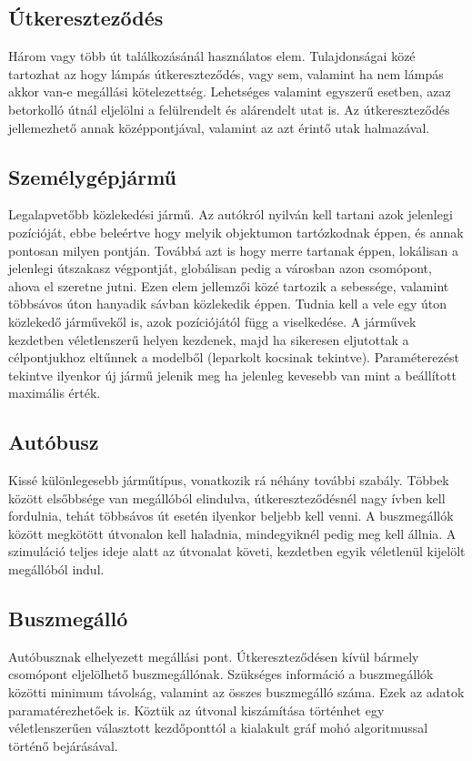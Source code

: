 \subsection{Útkereszteződés}
Három vagy több út találkozásánál használatos elem. Tulajdonságai közé tartozhat az hogy lámpás útkereszteződés, vagy sem, valamint ha nem lámpás akkor van-e megállási kötelezettség.
Lehetséges valamint egyszerű esetben, azaz betorkolló útnál eljelölni a felülrendelt és alárendelt utat is. Az útkereszteződés jellemezhető annak középpontjával, valamint az azt érintő utak
halmazával.
\subsection{Személygépjármű}
Legalapvetőbb közlekedési jármű. Az autókról nyilván kell tartani azok jelenlegi pozícióját, ebbe beleértve hogy melyik objektumon tartózkodnak éppen, és annak pontosan milyen pontján. Továbbá azt
is hogy merre tartanak éppen, lokálisan a jelenlegi útszakasz végpontját, globálisan pedig a városban azon csomópont, ahova el szeretne jutni. Ezen elem jellemzői közé tartozik a sebessége, valamint többsávos úton 
hanyadik sávban közlekedik éppen. Tudnia kell a vele egy úton közlekedő járművekől is, azok pozíciójától függ a viselkedése. A járművek kezdetben véletlenszerű helyen kezdenek, majd ha sikeresen eljutottak a célpontjukhoz 
eltűnnek a modelből (leparkolt kocsinak tekintve). Paraméterezést tekintve ilyenkor új jármű jelenik meg ha jelenleg kevesebb van mint a beállított maximális érték.
\subsection{Autóbusz}
Kissé különlegesebb járműtípus, vonatkozik rá néhány további szabály. Többek között elsőbbsége van megállóból elindulva, útkereszteződésnél nagy ívben kell fordulnia, tehát többsávos út esetén ilyenkor
beljebb kell venni. A buszmegállók között megkötött útvonalon kell haladnia, mindegyiknél pedig meg kell állnia. A szimuláció teljes ideje alatt az útvonalat követi, kezdetben egyik véletlenül kijelölt megállóból indul.
\subsection{Buszmegálló}
Autóbusznak elhelyezett megállási pont. Útkereszteződésen kívül bármely csomópont eljelölhető buszmegállónak. Szükséges információ a buszmegállók közötti minimum távolság, valamint az összes buszmegálló száma.
Ezek az adatok paramatérezhetőek is. Köztük az útvonal kiszámítása történhet egy véletlenszerűen választott kezdőponttól a kialakult gráf mohó algoritmussal történő bejárásával.
